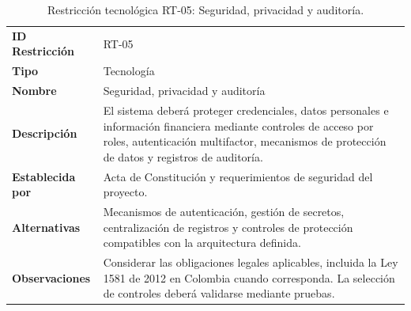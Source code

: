\documentclass[11pt,a4paper,oneside]{article}
\begin{document}
\begingroup
\small
\setlength{\tabcolsep}{7pt}
\renewcommand{\arraystretch}{1.30}
\setlength{\anchoRegistro}{\dimexpr\textwidth-4\tabcolsep-3\arrayrulewidth\relax}
\begin{table}[H]
\centering
\caption{Restricción tecnológica RT-05: Seguridad, privacidad y auditoría.}
\label{tab:restriccion-rt-05}
\begin{tabular}{|
>{\RaggedRight\arraybackslash}p{.28\anchoRegistro}|
>{\RaggedRight\arraybackslash}p{.72\anchoRegistro}|}
\hline
\rowcolor{negroTabla}
\multicolumn{2}{|l|}{\color{white}\bfseries Registro de Restricción Tecnológica}\\\hline
\cellcolor{azulTabla}\bfseries ID Restricción
& RT-05\\\hline
\cellcolor{azulTabla}\bfseries Tipo
& Tecnología\\\hline
\cellcolor{azulTabla}\bfseries Nombre
& Seguridad, privacidad y auditoría\\\hline
\cellcolor{azulTabla}\bfseries Descripción
& El sistema deberá proteger credenciales, datos personales e información financiera mediante controles de acceso por roles, autenticación multifactor, mecanismos de protección de datos y registros de auditoría.\\\hline
\cellcolor{azulTabla}\bfseries Establecida por
& Acta de Constitución y requerimientos de seguridad del proyecto.\\\hline
\cellcolor{azulTabla}\bfseries Alternativas
& Mecanismos de autenticación, gestión de secretos, centralización de registros y controles de protección compatibles con la arquitectura definida.\\\hline
\cellcolor{azulTabla}\bfseries Observaciones
& Considerar las obligaciones legales aplicables, incluida la Ley 1581 de 2012 en Colombia cuando corresponda. La selección de controles deberá validarse mediante pruebas.\\\hline
\end{tabular}
\end{table}
\endgroup
\end{document}
